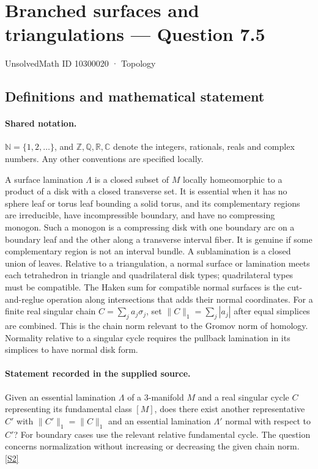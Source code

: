 \documentclass[11pt]{article}
\newcommand{\sref}[2]{\hyperlink{source:#1:#2}{[S#2]}}
\begin{document}
\setcounter{section}{10300019}
\section{Branched surfaces and triangulations — Question 7.5}\label{10300020}
{\small\sffamily UnsolvedMath ID 10300020 · Topology}
\subsection{Definitions and mathematical statement}

\paragraph{Shared notation.}$\mathbb N=\{1,2,\ldots\}$, and $\mathbb Z,\mathbb Q,\mathbb R,\mathbb C$ denote the integers, rationals, reals and complex numbers. Any other conventions are specified locally.


A surface lamination $\Lambda$ is a closed subset of $M$ locally homeomorphic to a product of a disk with a closed transverse set. It is essential when it has no sphere leaf or torus leaf bounding a solid torus, and its complementary regions are irreducible, have incompressible boundary, and have no compressing monogon. Such a monogon is a compressing disk with one boundary arc on a boundary leaf and the other along a transverse interval fiber. It is genuine if some complementary region is not an interval bundle. A sublamination is a closed union of leaves. Relative to a triangulation, a normal surface or lamination meets each tetrahedron in triangle and quadrilateral disk types; quadrilateral types must be compatible. The Haken sum for compatible normal surfaces is the cut-and-reglue operation along intersections that adds their normal coordinates. For a finite real singular chain $C=\sum_j a_j\sigma_j$, set $\|C\|_1=\sum_j|a_j|$ after equal simplices are combined. This is the chain norm relevant to the Gromov norm of homology. Normality relative to a singular cycle requires the pullback lamination in its simplices to have normal disk form.
\paragraph{Statement recorded in the supplied source.}
Given an essential lamination $\Lambda$ of a $3$-manifold $M$ and a real singular cycle $C$ representing its fundamental class $[M]$, does there exist another representative $C'$ with $\|C'\|_1=\|C\|_1$ and an essential lamination $\Lambda'$ normal with respect to $C'$? For boundary cases use the relevant relative fundamental cycle. The question concerns normalization without increasing or decreasing the given chain norm. \sref{10300020}{2}
\end{document}

